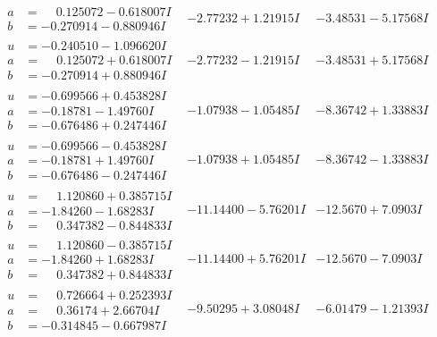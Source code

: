 \documentclass[1p]{elsarticle_modified}
\theoremstyle{definition}
\begin{document}
$$\begin{array}{c|c|c}
\begin{aligned}
a &= \phantom{-}0.125072 - 0.618007 I \\
b &= -0.270914 - 0.880946 I\end{aligned}
 & -2.77232 + 1.21915 I & -3.48531 - 5.17568 I \\ \hline\begin{aligned}
u &= -0.240510 - 1.096620 I \\
a &= \phantom{-}0.125072 + 0.618007 I \\
b &= -0.270914 + 0.880946 I\end{aligned}
 & -2.77232 - 1.21915 I & -3.48531 + 5.17568 I \\ \hline\begin{aligned}
u &= -0.699566 + 0.453828 I \\
a &= -0.18781 - 1.49760 I \\
b &= -0.676486 + 0.247446 I\end{aligned}
 & -1.07938 - 1.05485 I & -8.36742 + 1.33883 I \\ \hline\begin{aligned}
u &= -0.699566 - 0.453828 I \\
a &= -0.18781 + 1.49760 I \\
b &= -0.676486 - 0.247446 I\end{aligned}
 & -1.07938 + 1.05485 I & -8.36742 - 1.33883 I \\ \hline\begin{aligned}
u &= \phantom{-}1.120860 + 0.385715 I \\
a &= -1.84260 - 1.68283 I \\
b &= \phantom{-}0.347382 - 0.844833 I\end{aligned}
 & -11.14400 - 5.76201 I & -12.5670 + 7.0903 I \\ \hline\begin{aligned}
u &= \phantom{-}1.120860 - 0.385715 I \\
a &= -1.84260 + 1.68283 I \\
b &= \phantom{-}0.347382 + 0.844833 I\end{aligned}
 & -11.14400 + 5.76201 I & -12.5670 - 7.0903 I \\ \hline\begin{aligned}
u &= \phantom{-}0.726664 + 0.252393 I \\
a &= \phantom{-}0.36174 + 2.66704 I \\
b &= -0.314845 - 0.667987 I\end{aligned}
 & -9.50295 + 3.08048 I & -6.01479 - 1.21393 I \\ \hline\begin{aligned}

\end{aligned}
\end{array}$$
\end{document}
